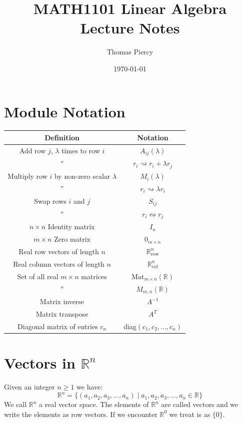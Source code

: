 \documentclass[12pt]{article}
\title{\textbf{MATH1101 Linear Algebra Lecture Notes}}
\author{Thomas Piercy}
\date{\today{}}
\newcommand{\mat}[3]{\text{Mat}_{#1\times#2}(\mathbb{#3})}
\begin{document}
\maketitle
\hrulefill
{}
\tableofcontents
\newpage
\section{Module Notation}
\begin{table}[H]
    \begin{tabular}{|c|c|}
    \hline
       Definition & Notation \\ \hline
       Add row \(j\), \(\lambda\) times to row \(i\)  & \(A_{ij}(\lambda)\) \\ \hline
       \("\) & \(r_i\rightsquigarrow r_i+\lambda r_j\) \\ \hline
       Multiply row \(i\) by non-zero scalar \(\lambda\) & \(M_i(\lambda)\) \\ \hline
       \("\) & \(r_i\rightsquigarrow\lambda r_i\) \\ \hline
       Swap rows \(i\) and \(j\) & \(S_{ij}\) \\ \hline
       \("\) & \(r_i\leftrightsquigarrow r_j\) \\ \hline
       \(n\times n\) Identity matrix & \(I_n\) \\ \hline
       \(m\times n\) Zero matrix & \(0_{m\times n}\) \\ \hline
       Real row vectors of length \(n\) & \(\mathbb{R}^n_{\text{row}}\) \\ \hline
       Real column vectors of length \(n\) & \(\mathbb{R}^n_{\text{col}}\) \\ \hline
       Set of all real \(m\times n\) matrices & \(\mat{m}{n}{R}\) \\ \hline
       \("\) & \(M_{m,n}(\mathbb{R})\) \\ \hline
       Matrix inverse & \(A^{-1}\) \\ \hline
       Matrix transpose & \(A^T\) \\ \hline
       Diagonal matrix of entries \(c_n\) & diag\((c_1,c_2,...,c_n)\) \\ \hline
    \end{tabular}
\end{table}
\section{Vectors in \(\mathbb{R}^n\)}
Given an integer \(n\geq1\) we have:
\[\mathbb{R}^n=\{(a_1,a_2,a_3,\dots,a_n)\;\vert\;a_1,a_2,a_3,\dots,a_n\in\mathbb{R}\}\]
We call \(\mathbb{R}^n\) a real vector space. The elements of \(\mathbb{R}^n\) are called vectors and we write the elements as row vectors. If we encounter \(\mathbb{R}^0\) we treat is as \(\{0\}\). 
\end{document}
